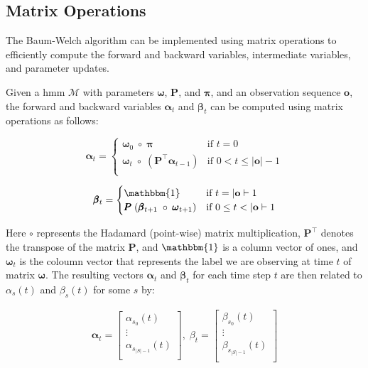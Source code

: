 \subsection{Matrix Operations}\label{subsec:matrix-operations}
The Baum-Welch algorithm can be implemented using matrix operations to efficiently compute the forward and backward variables, intermediate variables, and parameter updates.

Given a \gls{hmm} $\mathcal{M}$ with parameters $\pmb{\omega}$, $\pmb{P}$, and $\pmb{\pi}$, and an observation sequence $\mathbf{o}$, the forward and backward variables $\pmb{\alpha}_t$ and $\pmb{\beta}_t$ can be computed using matrix operations as follows:

\begin{equation}
    \label{eq:alpha}
    \pmb{\alpha}_t =
    \begin{cases}
        \pmb{\omega}_0 \; \circ \; \pmb{\pi}   & \text{if } t = 0    \\
        \pmb{\omega}_t \; \circ \; \left( \pmb{P}^\top \pmb{\alpha}_{t - 1} \right)   & \text{if } 0 < t \leq |\mathbf{o}|-1 \\
    \end{cases}
\end{equation}


\begin{equation}
    \label{eq:beta}
    \pmb{\beta}_t =
    \begin{cases}
        \mathbbm{1} & \text{if } t = |\mathbf{o}|-1        \\
        \pmb{P} \; (\pmb{\beta}_{t + 1} \; \circ \; \pmb{\omega}_{t + 1}) & \text{if } 0 \leq t < |\mathbf{o}|-1 \\
    \end{cases}
\end{equation}

Here $\circ$ represents the Hadamard (point-wise) matrix multiplication, $\pmb{P}^\top$ denotes the transpose of the matrix $\pmb{P}$, and $\mathbbm{1}$ is a column vector of ones, and $\pmb{\omega}_t$ is the coloumn vector that represents the label we are observing at time $t$ of matrix $\pmb{\omega}$.
The resulting vectors $\pmb{\alpha}_t$ and $\pmb{\beta}_t$ for each time step $t$ are then related to $\alpha_s(t)$ and $\beta_s(t)$ for some $s$ by:

\begin{align}
\pmb{\alpha}
    _t = \begin{bmatrix}
             \alpha_{s_0}(t)       \\
             \vdots                \\
             \alpha_{s_{|S|-1}}(t) \\
    \end{bmatrix}, \;
    {\beta}_t = \begin{bmatrix}
                    \beta_{s_0}(t)       \\
                    \vdots               \\
                    \beta_{s_{|S|-1}}(t) \\
    \end{bmatrix}
\end{align}

